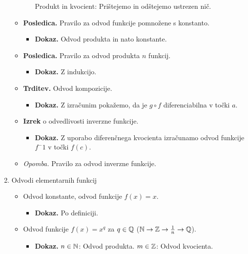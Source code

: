 \begin{enumerate}
\begin{itemize}
\begin{itemize}
            Produkt in kvocient: Prištejemo in odštejemo ustrezen nič.
        \end{itemize}
        \item \colorbox{orange!30}{\textbf{Posledica.}} Pravilo za odvod funkcije pomnožene s konstanto.
        \begin{itemize}
            \item \colorbox{green!30}{\textbf{Dokaz.}} Odvod produkta in nato konstante.
        \end{itemize}
        \item \colorbox{orange!30}{\textbf{Posledica.}} Pravilo za odvod produkta $n$ funkcij.
        \begin{itemize}
            \item \colorbox{green!30}{\textbf{Dokaz.}} Z indukcijo.
        \end{itemize}
        \item \colorbox{blue!30}{\textbf{Trditev.}} Odvod kompozicije.
        \begin{itemize}
            \item \colorbox{green!30}{\textbf{Dokaz.}} Z izračunim pokažemo, da je $g \circ f$ diferenciabilna v točki $a$. 
        \end{itemize}
        \item \colorbox{blue!30}{\textbf{Izrek}} o odvedlivosti inverzne funkcije.
        \begin{itemize}
            \item \colorbox{green!30}{\textbf{Dokaz.}} Z uporabo diferenčnega kvocienta izračunamo odvod funkcije $f^-1$ v točki $f(c)$.
        \end{itemize}
        \item \colorbox{yellow!30}{\emph{Opomba.}} Pravilo za odvod inverzne funkcije.
    \end{itemize}

    \newpage
    \item Odvodi elementarnih funkcij
    \begin{itemize}
        \item Odvod konstante, odvod funkcije $f(x)=x$.
        \begin{itemize}
            \item \colorbox{green!30}{\textbf{Dokaz.}} Po definiciji.
        \end{itemize}
        \item Odvod funkcije $f(x) = x^{q}$ za $q \in \mathbb{Q}$ ($\mathbb{N} \to \mathbb{Z} \to \frac{1}{n} \to \mathbb{Q}$).
        \begin{itemize}
            \item \colorbox{green!30}{\textbf{Dokaz.}} $n \in \mathbb{N}$: Odvod produkta.            
            $m \in \mathbb{Z}$: Odvod kvocienta.
            

\end{itemize}
\end{itemize}
\end{enumerate}
